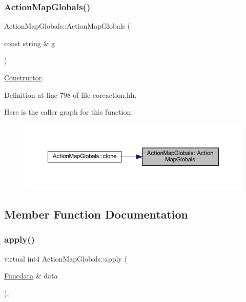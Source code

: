 \subsubsection{\texorpdfstring{ActionMapGlobals()}{ActionMapGlobals()}}
{\footnotesize\ttfamily Action\+Map\+Globals\+::\+Action\+Map\+Globals (\begin{DoxyParamCaption}\item[{const string \&}]{g }\end{DoxyParamCaption})\hspace{0.3cm}{\ttfamily [inline]}}



\mbox{\hyperlink{class_constructor}{Constructor}}. 



Definition at line 798 of file coreaction.\+hh.

Here is the caller graph for this function\+:
\nopagebreak
\begin{figure}[H]
\begin{center}
\leavevmode
\includegraphics[width=350pt]{class_action_map_globals_abea8483d82fba9d828bd8a5d216dac80_icgraph}
\end{center}
\end{figure}


\subsection{Member Function Documentation}
\mbox{\label{class_action_map_globals_a8d9376bd7f1d026c922f20f4b069e739}} 
\subsubsection{\texorpdfstring{apply()}{apply()}}
{\footnotesize\ttfamily virtual int4 Action\+Map\+Globals\+::apply (\begin{DoxyParamCaption}\item[{\mbox{\hyperlink{class_funcdata}{Funcdata}} \&}]{data }\end{DoxyParamCaption})\hspace{0.3cm}{\ttfamily [inline]}, {\ttfamily [virtual]}}



